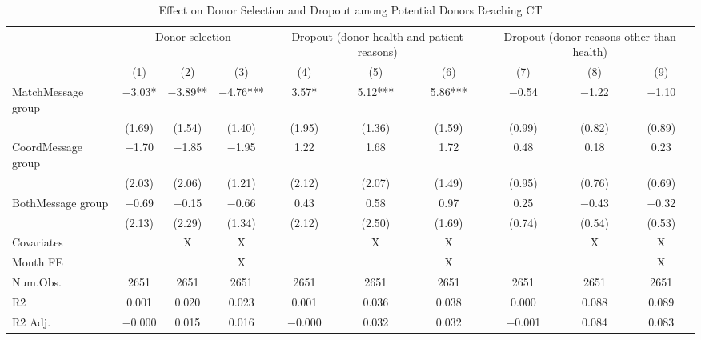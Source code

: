 \documentclass[12pt, a4paper]{article}
\begin{document}
\begin{landscape}\begin{table}[H]
\centering\centering
\caption{\label{tab:lm-decompose-effect-donor-selection}Effect on Donor Selection and Dropout among Potential Donors Reaching CT}
\centering
\fontsize{8}{10}\selectfont
\begin{threeparttable}
\begin{tabular}[t]{lccccccccc}
\toprule
\multicolumn{1}{c}{ } & \multicolumn{3}{c}{Donor selection} & \multicolumn{3}{c}{Dropout (donor health and patient reasons)} & \multicolumn{3}{c}{Dropout (donor reasons other than health)} \\
\cmidrule(l{3pt}r{3pt}){2-4} \cmidrule(l{3pt}r{3pt}){5-7} \cmidrule(l{3pt}r{3pt}){8-10}
  & (1) & (2) & (3) & (4) & (5) & (6) & (7) & (8) & (9)\\
\midrule
MatchMessage group & \num{-3.03}* & \num{-3.89}** & \num{-4.76}*** & \num{3.57}* & \num{5.12}*** & \num{5.86}*** & \num{-0.54} & \num{-1.22} & \num{-1.10}\\
 & (\num{1.69}) & (\num{1.54}) & (\num{1.40}) & (\num{1.95}) & (\num{1.36}) & (\num{1.59}) & (\num{0.99}) & (\num{0.82}) & (\num{0.89})\\
CoordMessage group & \num{-1.70} & \num{-1.85} & \num{-1.95} & \num{1.22} & \num{1.68} & \num{1.72} & \num{0.48} & \num{0.18} & \num{0.23}\\
 & (\num{2.03}) & (\num{2.06}) & (\num{1.21}) & (\num{2.12}) & (\num{2.07}) & (\num{1.49}) & (\num{0.95}) & (\num{0.76}) & (\num{0.69})\\
BothMessage group & \num{-0.69} & \num{-0.15} & \num{-0.66} & \num{0.43} & \num{0.58} & \num{0.97} & \num{0.25} & \num{-0.43} & \num{-0.32}\\
 & (\num{2.13}) & (\num{2.29}) & (\num{1.34}) & (\num{2.12}) & (\num{2.50}) & (\num{1.69}) & (\num{0.74}) & (\num{0.54}) & (\num{0.53})\\
\midrule
Covariates &  & X & X &  & X & X &  & X & X\\
Month FE &  &  & X &  &  & X &  &  & X\\
Num.Obs. & \num{2651} & \num{2651} & \num{2651} & \num{2651} & \num{2651} & \num{2651} & \num{2651} & \num{2651} & \num{2651}\\
R2 & \num{0.001} & \num{0.020} & \num{0.023} & \num{0.001} & \num{0.036} & \num{0.038} & \num{0.000} & \num{0.088} & \num{0.089}\\
R2 Adj. & \num{-0.000} & \num{0.015} & \num{0.016} & \num{-0.000} & \num{0.032} & \num{0.032} & \num{-0.001} & \num{0.084} & \num{0.083}\\

\end{tabular}
\end{threeparttable}
\end{table}
\end{landscape}
\end{document}
